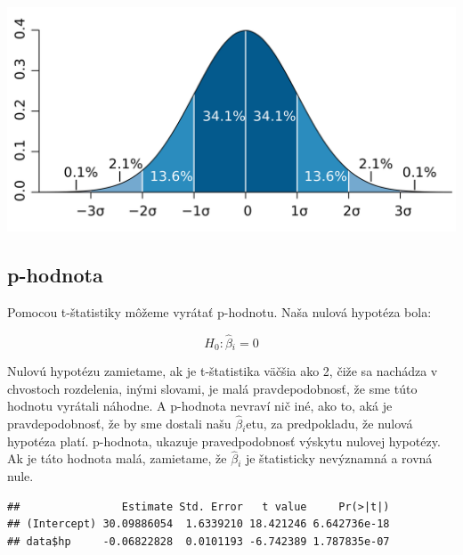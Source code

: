 \documentclass[]{article}
\newenvironment{Shaded}{\begin{snugshade}}{\end{snugshade}}
\newcommand{\CommentTok}[1]{\textcolor[rgb]{0.56,0.35,0.01}{\textit{#1}}}
\newcommand{\KeywordTok}[1]{\textcolor[rgb]{0.13,0.29,0.53}{\textbf{#1}}}
\newcommand{\NormalTok}[1]{#1}
\newcommand{\OperatorTok}[1]{\textcolor[rgb]{0.81,0.36,0.00}{\textbf{#1}}}
\begin{document}
\begin{center}

\includegraphics{diplomka obrazky/8.png}

\end{center}

\hypertarget{p-hodnota}{%
\subsection{p-hodnota}\label{p-hodnota}}

Pomocou t-štatistiky môžeme vyrátať p-hodnotu. Naša nulová hypotéza
bola:

\[H_0: \hat\beta{}_i = 0\]

Nulovú hypotézu zamietame, ak je t-štatistika väčšia ako 2, čiže sa
nachádza v chvostoch rozdelenia, inými slovami, je malá pravdepodobnosť,
že sme túto hodnotu vyrátali náhodne. A p-hodnota nevraví nič iné, ako
to, aká je pravdepodobnosť, že by sme dostali našu \(\hat\beta{}_i\)etu,
za predpokladu, že nulová hypotéza platí. p-hodnota, ukazuje
pravedpodobnosť výskytu nulovej hypotézy. Ak je táto hodnota malá,
zamietame, že \(\hat\beta{}_i\) je štatisticky nevýznamná a rovná nule.

\begin{Shaded}
\end{Shaded}

\begin{verbatim}
##                Estimate Std. Error   t value     Pr(>|t|)
## (Intercept) 30.09886054  1.6339210 18.421246 6.642736e-18
## data$hp     -0.06822828  0.0101193 -6.742389 1.787835e-07
\end{verbatim}
\end{document}
